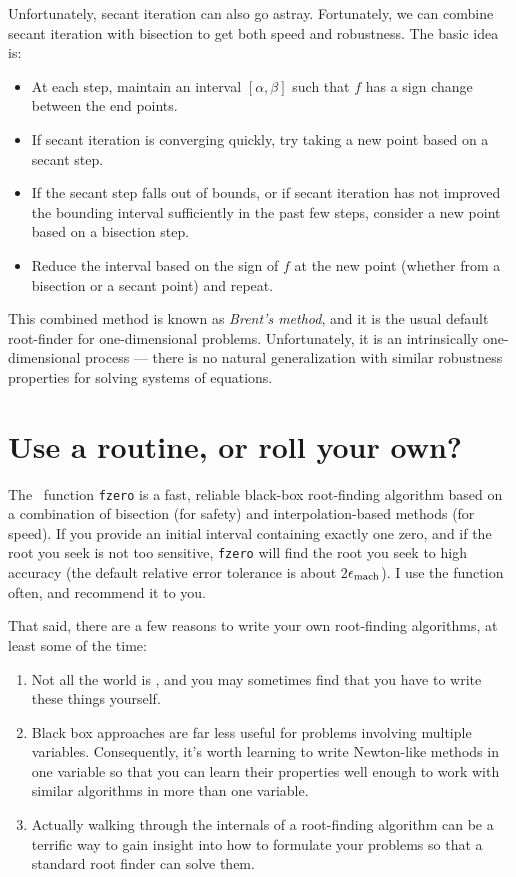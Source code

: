 \documentclass[12pt, leqno]{article} %
\begin{document}
Unfortunately, secant iteration can also go astray.  Fortunately, we
can combine secant iteration with bisection to get both speed and
robustness.  The basic idea is:
\begin{itemize}
\item
  At each step, maintain an interval $[\alpha,\beta]$ such that $f$
  has a sign change between the end points.
\item
  If secant iteration is converging quickly, try taking a new point
  based on a secant step.
\item
  If the secant step falls out of bounds, or if secant iteration has
  not improved the bounding interval sufficiently in the past few
  steps, consider a new point based on a bisection step.
\item
  Reduce the interval based on the sign of $f$ at the new point
  (whether from a bisection or a secant point) and repeat.
\end{itemize}
This combined method is known as {\em Brent's method}, and it is the
usual default root-finder for one-dimensional problems.
Unfortunately, it is an intrinsically one-dimensional process ---
there is no natural generalization with similar robustness properties
for solving systems of equations.

\section*{Use a routine, or roll your own?}


The \matlab\ function {\tt fzero} is a fast, reliable black-box root-finding
algorithm based on a combination of bisection (for safety) and
interpolation-based methods (for speed).  If you provide an initial
interval containing exactly one zero, and if the root you seek is not
too sensitive, {\tt fzero} will find the root you seek to high accuracy
(the default relative error tolerance is about 2$\epsilon_{\mathrm{mach}}$).  I use
the function often, and recommend it to you.

That said, there are a few reasons to write your own root-finding
algorithms, at least some of the time:
\begin{enumerate}
\item
  Not all the world is \matlab, and you may sometimes find that you
  have to write these things yourself.
\item 
  Black box approaches are far less useful for problems involving
  multiple variables.  Consequently, it's worth learning to write
  Newton-like methods in one variable so that you can learn their
  properties well enough to work with similar algorithms in more than
  one variable.
\item
  Actually walking through the internals of a root-finding algorithm
  can be a terrific way to gain insight into how to formulate your
  problems so that a standard root finder can solve them.
\end{enumerate}
\end{document}
